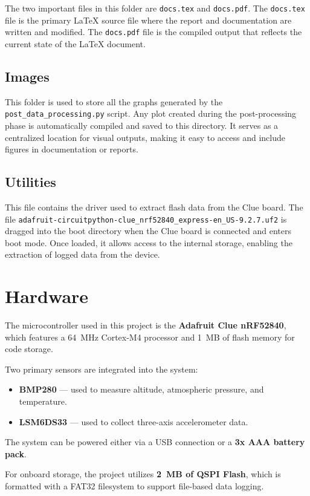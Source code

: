 \documentclass[12pt]{report}
\begin{document}
The two important files in this folder are \texttt{docs.tex} and \texttt{docs.pdf}. The \texttt{docs.tex} file is the primary LaTeX source file where the report and documentation are written and modified. The \texttt{docs.pdf} file is the compiled output that reflects the current state of the LaTeX document.

\section{Images}

This folder is used to store all the graphs generated by the \texttt{post\_data\_processing.py} script. Any plot created during the post-processing phase is automatically compiled and saved to this directory. It serves as a centralized location for visual outputs, making it easy to access and include figures in documentation or reports.




\section{Utilities}
This file contains the driver used to extract flash data from the Clue board. The file \texttt{adafruit-circuitpython-clue\_nrf52840\_express-en\_US-9.2.7.uf2} is dragged into the boot directory when the Clue board is connected and enters boot mode. Once loaded, it allows access to the internal storage, enabling the extraction of logged data from the device.




\chapter{Hardware}
The microcontroller used in this project is the \textbf{Adafruit Clue nRF52840}, which features a 64~MHz Cortex-M4 processor and 1~MB of flash memory for code storage.

Two primary sensors are integrated into the system:
\begin{itemize}
    \item \textbf{BMP280} — used to measure altitude, atmospheric pressure, and temperature.
    \item \textbf{LSM6DS33} — used to collect three-axis accelerometer data.
\end{itemize}

The system can be powered either via a USB connection or a \textbf{3x AAA battery pack}.

For onboard storage, the project utilizes \textbf{2~MB of QSPI Flash}, which is formatted with a FAT32 filesystem to support file-based data logging.
\end{document}
